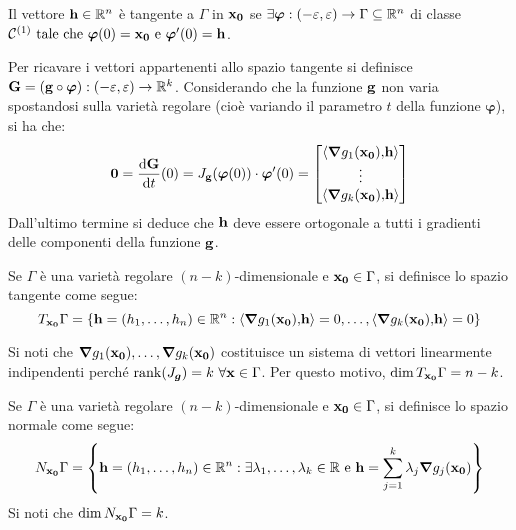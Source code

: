\begin{definition}
    Il vettore $\vb{h} \in \mathbb{R}^n$ è tangente a $\Gamma$ in $\vb{x_0}$ se $\exists \bm\varphi: (-\varepsilon, \varepsilon) \to \Gamma \subseteq \mathbb{R}^n$ di classe $\mathcal{C}^{(1)} \text{ tale che } \bm\varphi (0) = \vb{x_0} \text{ e } \bm\varphi ' (0) = \vb{h}$.
\end{definition}

Per ricavare i vettori appartenenti allo spazio tangente si definisce $\vb{G}=(\vb{g}\circ\bm\varphi):(-\varepsilon,\varepsilon)\to\mathbb{R}^k$. Considerando che la funzione $\vb{g}$ non varia spostandosi sulla varietà regolare (cioè variando il parametro $t$ della funzione $\bm\varphi$), si ha che:
$$
    \vb{0}=\frac{\dd \vb{G}}{\dd t}(0)=J_{\vb{g}}(\bm\varphi(0))\cdot \bm\varphi'(0)=
    \begin{bmatrix}
        \left\langle\grad g_1(\vb{x_0}){,}\vb{h}\right\rangle\\
        \vdots\\
        \left\langle\grad g_k(\vb{x_0}){,}\vb{h}\right\rangle
    \end{bmatrix}
$$
Dall'ultimo termine si deduce che $\vb{h}$ deve essere ortogonale a tutti i gradienti delle componenti della funzione $\vb{g}$.

\begin{definition}
    Se $\Gamma$ è una varietà regolare $(n-k)$-dimensionale e $\vb{x_0} \in \Gamma$, si definisce lo spazio tangente come segue:
    $$
        T_{\vb{x_0}}\Gamma = \{ \vb{h}=(h_1,\dots,h_n) \in \R^n : \ip{\grad g_1(\vb{x_0})}{\vb{h}}=0,\dots,\ip{\grad g_k(\vb{x_0})}{\vb{h}}=0 \}
    $$
\end{definition}

\begin{remark}
    Si noti che $\grad g_1(\vb{x_0}),\dots,\grad g_k (\vb{x_0})$ costituisce un sistema di vettori linearmente indipendenti perché $\rank(J_{\bm g})=k \ \forall \vb{x} \in \Gamma$. Per questo motivo, $\dim T_{\vb{x_0}}\Gamma= n-k$.
\end{remark}

\begin{definition}
    Se $\Gamma$ è una varietà regolare $(n-k)$-dimensionale e $\vb{x_0} \in \Gamma$, si definisce lo spazio normale come segue:
    $$
        N_{\vb{x_0}}\Gamma = \left\{ \vb{h}=(h_1,\dots,h_n) \in \mathbb{R}^n : \exists \lambda_1, \dots, \lambda_k \in \mathbb{R} \text{ e } \vb{h}=\sum_{j=1}^k \lambda_j \grad g_j(\vb{x_0}) \right\}
    $$
    Si noti che $\dim N_{\vb{x_0}}\Gamma = k$.
\end{definition}

